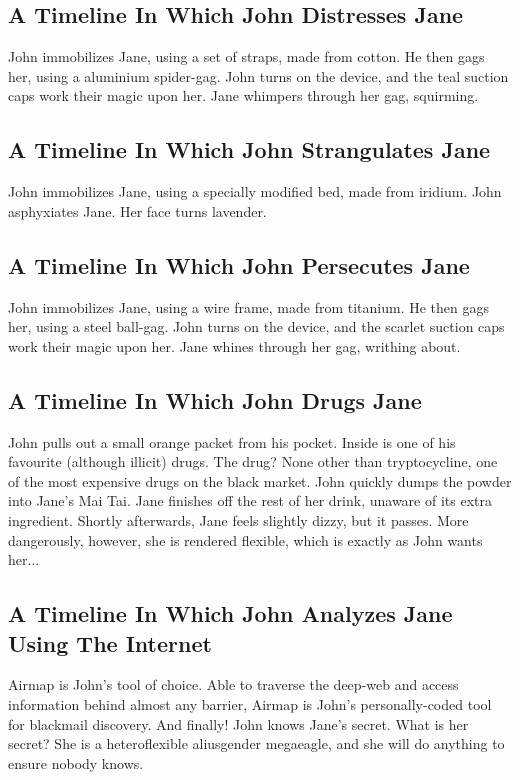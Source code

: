 \documentclass{article}
\begin{document}
\subsection{A Timeline In Which John Distresses Jane}


John immobilizes Jane, using a set of straps, made from cotton.
He then gags her, using a aluminium spider{-}gag.
John turns on the device, and the teal suction caps work their magic upon her.
Jane whimpers through her gag, squirming.
\subsection{A Timeline In Which John Strangulates Jane}


John immobilizes Jane, using a specially modified bed, made from iridium.
John asphyxiates Jane.
Her face turns lavender.
\subsection{A Timeline In Which John Persecutes Jane}


John immobilizes Jane, using a wire frame, made from titanium.
He then gags her, using a steel ball{-}gag.
John turns on the device, and the scarlet suction caps work their magic upon her.
Jane whines through her gag, writhing about.
\subsection{A Timeline In Which John Drugs Jane}


John pulls out a small orange packet from his pocket. Inside is one of his favourite (although illicit) drugs.
The drug? None other than tryptocycline, one of the most expensive drugs on the black market.
John quickly dumps the powder into Jane's Mai Tai.
Jane finishes off the rest of her drink, unaware of its extra ingredient.
Shortly afterwards, Jane feels slightly dizzy, but it passes.
More dangerously, however, she is rendered flexible, which is exactly as John wants her...
\subsection{A Timeline In Which John Analyzes Jane Using The Internet}


Airmap is John's tool of choice. Able to traverse the deep{-}web and access information behind almost any barrier, Airmap is John's personally{-}coded tool for blackmail discovery.
And finally!
John knows Jane's secret. What is her secret? She is a heteroflexible aliusgender megaeagle, and she will do anything to ensure nobody knows.
\end{document}
